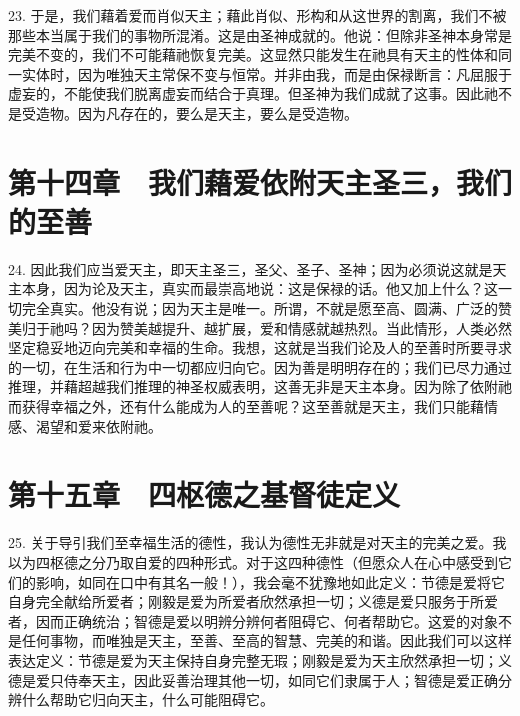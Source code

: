 23. 于是，我们藉着爱而肖似天主；藉此肖似、形构和从这世界的割离，我们不被那些本当属于我们的事物所混淆。这是由圣神成就的。他说：但除非圣神本身常是完美不变的，我们不可能藉祂恢复完美。这显然只能发生在祂具有天主的性体和同一实体时，因为唯独天主常保不变与恒常。并非由我，而是由保禄断言：凡屈服于虚妄的，不能使我们脱离虚妄而结合于真理。但圣神为我们成就了这事。因此祂不是受造物。因为凡存在的，要么是天主，要么是受造物。\par


\section{第十四章　我们藉爱依附天主圣三，我们的至善}

24. 因此我们应当爱天主，即天主圣三，圣父、圣子、圣神；因为必须说这就是天主本身，因为论及天主，真实而最崇高地说：这是保禄的话。他又加上什么？这一切完全真实。他没有说；因为天主是唯一。所谓，不就是愿至高、圆满、广泛的赞美归于祂吗？因为赞美越提升、越扩展，爱和情感就越热烈。当此情形，人类必然坚定稳妥地迈向完美和幸福的生命。我想，这就是当我们论及人的至善时所要寻求的一切，在生活和行为中一切都应归向它。因为善是明明存在的；我们已尽力通过推理，并藉超越我们推理的神圣权威表明，这善无非是天主本身。因为除了依附祂而获得幸福之外，还有什么能成为人的至善呢？这至善就是天主，我们只能藉情感、渴望和爱来依附祂。\par


\section{第十五章　四枢德之基督徒定义}

25. 关于导引我们至幸福生活的德性，我认为德性无非就是对天主的完美之爱。我以为四枢德之分乃取自爱的四种形式。对于这四种德性（但愿众人在心中感受到它们的影响，如同在口中有其名一般！），我会毫不犹豫地如此定义：节德是爱将它自身完全献给所爱者；刚毅是爱为所爱者欣然承担一切；义德是爱只服务于所爱者，因而正确统治；智德是爱以明辨分辨何者阻碍它、何者帮助它。这爱的对象不是任何事物，而唯独是天主，至善、至高的智慧、完美的和谐。因此我们可以这样表达定义：节德是爱为天主保持自身完整无瑕；刚毅是爱为天主欣然承担一切；义德是爱只侍奉天主，因此妥善治理其他一切，如同它们隶属于人；智德是爱正确分辨什么帮助它归向天主，什么可能阻碍它。\par

